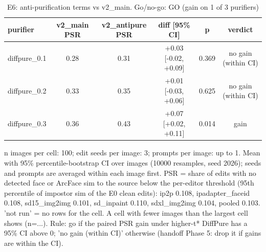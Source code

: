 \begin{table}[t]
\centering
\small
\begin{tabular}{lccccc}
\toprule
purifier & v2\_main PSR & v2\_antipure PSR & diff [95\% CI] & p & verdict \\
\midrule
diffpure\_0.1 & 0.28 & 0.31 & +0.03 [-0.02, +0.09] & 0.369 & no gain (within CI) \\
diffpure\_0.2 & 0.33 & 0.35 & +0.01 [-0.03, +0.06] & 0.625 & no gain (within CI) \\
diffpure\_0.3 & 0.36 & 0.43 & +0.07 [+0.02, +0.11] & 0.014 & gain \\
\bottomrule
\end{tabular}
\caption{E6: anti-purification terms vs v2\_main. Go/no-go: GO (gain on 1 of 3 purifiers)}
\label{tab:e6}
\par\footnotesize n images per cell: 100; edit seeds per image: 3; prompts per image: up to 1. Mean with 95\% percentile-bootstrap CI over images (10000 resamples, seed 2026); seeds and prompts are averaged within each image first. PSR = share of edits with no detected face or ArcFace sim to the source below the per-editor threshold (95th percentile of impostor sim of the E0 clean edits): ip2p 0.108, ipadapter\_faceid 0.108, sd15\_img2img 0.101, sd\_inpaint 0.110, sdxl\_img2img 0.104, pooled 0.103. 'not run' = no rows for the cell. A cell with fewer images than the largest cell shows (n=...). Rule: go if the paired PSR gain under higher-t* DiffPure has a 95\% CI above 0; 'no gain (within CI)' otherwise (handoff Phase 5: drop it if gains are within the CI).
\end{table}
